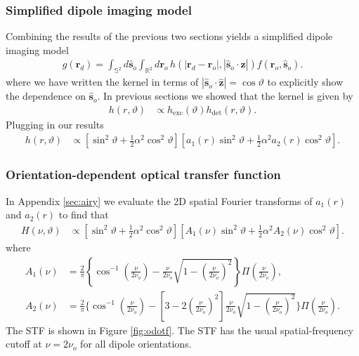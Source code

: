 \documentclass{osa-article}
\providecommand{\ro}{\mathbf{\mathbf{r}}_o}
\providecommand{\so}{\mathbf{\hat{s}}_o}
\providecommand{\rd}{\mathbf{r}_d}
\providecommand{\mh}[1]{\mathbf{\hat{#1}}}
\providecommand{\mbb}[1]{\mathbb{#1}}
\begin{document}
 \subsubsection{Simplified dipole imaging model}
 Combining the results of the previous two sections yields a simplified dipole
 imaging model 
 \begin{align}
g(\rd{}) = \int_{\mbb{S}^2}d\so{}\int_{\mbb{R}^2}d\ro{}\, h(|\rd - \ro|, |\so\cdot \mh{z}|)f(\ro, \so).\label{eq:simplified}
 \end{align}
 where we have written the kernel in terms of $|\so\cdot\mh{z}| = \cos\vartheta$
 to explicitly show the dependence on $\so$. In previous sections we showed that the
 kernel is given by 
 \begin{align}
   h(r, \vartheta) &\propto h_{\text{exc}}(\vartheta)h_{\text{det}}(r,\vartheta).
 \end{align}
 Plugging in our results
 \begin{align}
   h(r, \vartheta) &\propto \left[\sin^2\vartheta + \frac{1}{2}\alpha^2 \cos^2\vartheta\right]\left[a_1(r)\sin^2\vartheta + \frac{1}{2}\alpha^2 a_2(r)\cos^2\vartheta\right]. \label{eq:sa-psf}
 \end{align}

 \subsubsection{Orientation-dependent optical transfer function}\label{sec:trans}
  In Appendix \ref{sec:airy} we evaluate the 2D spatial Fourier transforms of
  $a_1(r)$ and $a_2(r)$ to find that
  \begin{align}
    H(\nu, \vartheta) &\propto \left[\sin^2\vartheta + \frac{1}{2}\alpha^2 \cos^2\vartheta\right]\left[A_1(\nu)\sin^2\vartheta + \frac{1}{2}\alpha^2 A_2(\nu)\cos^2\vartheta\right].
  \end{align}
  where 
\begin{align}
  A_1(\nu) &= \frac{2}{\pi}\left\{\cos^{-1}\left(\frac{\nu}{2\nu_o}\right) - \frac{\nu}{2\nu_o}\sqrt{1 - \left(\frac{\nu}{2\nu_o}\right)^2}\right\}\Pi\left(\frac{\nu}{2\nu_o}\right), \\
  A_2(\nu) &= \frac{2}{\pi}\Bigg\{\cos^{-1}\left(\frac{\nu}{2\nu_o}\right) - \left[3 - 2\left(\frac{\nu}{2\nu_o}\right)^2\right]\frac{\nu}{2\nu_o}\sqrt{1 - \left(\frac{\nu}{2\nu_o}\right)^2}\Bigg\}\Pi\left(\frac{\nu}{2\nu_o}\right).
\end{align}
The STF is shown in Figure \ref{fig:odotf}. The STF has the usual
spatial-frequency cutoff at $\nu = 2\nu_o$ for all dipole orientations. 
\end{document}
